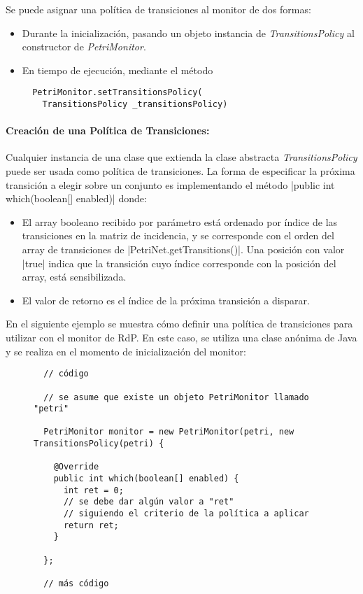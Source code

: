 Se puede asignar una política de transiciones al monitor de dos formas:

\begin{itemize}
    \item Durante la inicialización, pasando un objeto instancia de
    \textit{TransitionsPolicy} al constructor de \textit{PetriMonitor}.
    \item En tiempo de ejecución, mediante el método\\ {
    \begin{verbatim}
  PetriMonitor.setTransitionsPolicy(
    TransitionsPolicy _transitionsPolicy)
    \end{verbatim}
    }
\end{itemize}

\paragraph{Creación de una Política de Transiciones:}
Cualquier instancia de una clase que extienda la clase abstracta
\textit{TransitionsPolicy} puede ser usada como política de transiciones.
La forma de especificar la próxima transición a elegir sobre un conjunto es
implementando el método |public int which(boolean[] enabled)| donde:
\begin{itemize}
    \item El array booleano recibido por parámetro está ordenado por índice de
    las transiciones en la matriz de incidencia, y se corresponde con el orden
    del array de transiciones de |PetriNet.getTransitions()|. Una
    posición con valor |true| indica que la transición cuyo índice
    corresponde con la posición del array, está sensibilizada.
    \item El valor de retorno es el índice de la próxima transición a disparar.
\end{itemize}

En el siguiente ejemplo se muestra cómo definir una política de transiciones
para utilizar con el monitor de RdP. En este caso, se utiliza una clase anónima
de Java y se realiza en el momento de inicialización del monitor:

\begin{figure}[H]
\centering
\begin{verbatim}
  // código
  
  // se asume que existe un objeto PetriMonitor llamado "petri"
  
  PetriMonitor monitor = new PetriMonitor(petri, new TransitionsPolicy(petri) {
  
    @Override
    public int which(boolean[] enabled) {
      int ret = 0;
      // se debe dar algún valor a "ret"
      // siguiendo el criterio de la política a aplicar
      return ret;
    }
    
  };
  
  // más código
\end{verbatim}
\end{figure}

